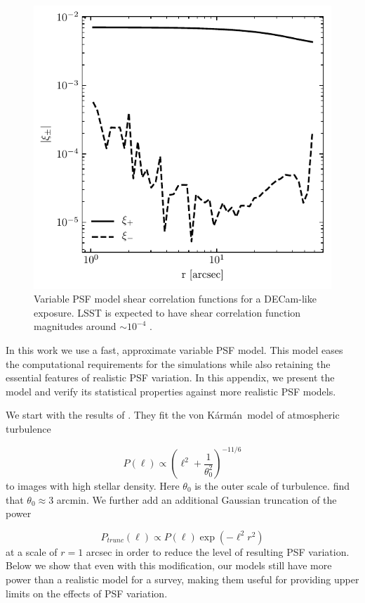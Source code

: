 \documentclass[fleqn,useAMS,usenatbib]{mnras}
\newcommand{\vonkarman}{{von K\'arm\'an}~}
\begin{document}
\begin{figure}
  \includegraphics[width=\columnwidth]{figures/psxi.pdf}
  \caption{
    Variable PSF model shear correlation functions for a DECam-like exposure. LSST
    is expected to have shear correlation function magnitudes around
    $\sim\!10^{-4}$ \citep{jee2011}.
    \label{fig:psxi}}
\end{figure}


In this work we use a fast, approximate variable PSF model. This model eases the
computational requirements for the simulations while also retaining the
essential features of realistic PSF variation. In this appendix, we present
the model and verify its statistical properties against more realistic PSF models.

We start with the results of \citet{heymans2012}. They fit the \vonkarman model
of atmospheric turbulence

\begin{displaymath}
  P(\ell) \propto \left(\ell^{2} + \frac{1}{\theta_{0}^2}\right)^{-11/6}
\end{displaymath}
to images with high stellar density. Here $\theta_{0}$ is the outer scale of
turbulence. \citep{heymans2012} find that $\theta_{0}\approx3$ arcmin.
We further add an additional Gaussian truncation of the power

\begin{displaymath}
  P_{trunc}(\ell) \propto P(\ell)\exp\left(-\ell^2r^{2}\right)
\end{displaymath}
at a scale of $r=1$ arcsec in order to reduce the level of resulting
PSF variation. Below we show that even with this modification, our models
still have more power than a realistic model for a survey, making them useful
for providing upper limits on the effects of PSF variation.
\end{document}

